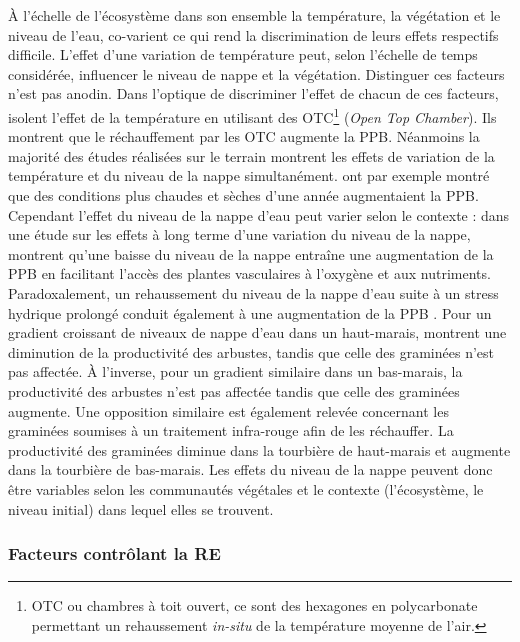 À l'échelle de l'écosystème dans son ensemble la température, la végétation et le niveau de l'eau, co-varient ce qui rend la discrimination de leurs effets respectifs difficile.
L'effet d'une variation de température peut, selon l'échelle de temps considérée, influencer le niveau de nappe et la végétation.
Distinguer ces facteurs n'est pas anodin.
Dans l'optique de discriminer l'effet de chacun de ces facteurs, \citet{munir2015} isolent l'effet de la température en utilisant des OTC\footnote{OTC ou chambres à toit ouvert, ce sont des hexagones en polycarbonate permettant un rehaussement \textit{in-situ} de la température moyenne de l'air.} (\textit{Open Top Chamber}).
Ils montrent que le réchauffement par les OTC augmente la PPB.
Néanmoins la majorité des études réalisées sur le terrain montrent les effets de variation de la température et du niveau de la nappe simultanément.
\citet{cai2010} ont par exemple montré que des conditions plus chaudes et sèches d'une année augmentaient la PPB.
Cependant l'effet du niveau de la nappe d'eau peut varier selon le contexte : dans une étude sur les effets à long terme d'une variation du niveau de la nappe, \citet{ballantyne2014} montrent qu'une baisse du niveau de la nappe entraîne une augmentation de la PPB en facilitant l'accès des plantes vasculaires à l'oxygène et aux nutriments.
Paradoxalement, un rehaussement du niveau de la nappe d'eau suite à un stress hydrique prolongé conduit également à une augmentation de la PPB \citep{strack2013}.
Pour un gradient croissant de niveaux de nappe d'eau dans un haut-marais, \citet{weltzin2000} montrent une diminution de la productivité des arbustes, tandis que celle des graminées n'est pas affectée.
À l'inverse, pour un gradient similaire dans un bas-marais, la productivité des arbustes n'est pas affectée tandis que celle des graminées augmente.
Une opposition similaire est également relevée concernant les graminées soumises à un traitement infra-rouge afin de les réchauffer.
La productivité des graminées diminue dans la tourbière de haut-marais et augmente dans la tourbière de bas-marais.
Les effets du niveau de la nappe peuvent donc être variables selon les communautés végétales et le contexte (l'écosystème, le niveau initial) dans lequel elles se trouvent.

\subsubsection{Facteurs contrôlant la RE}

